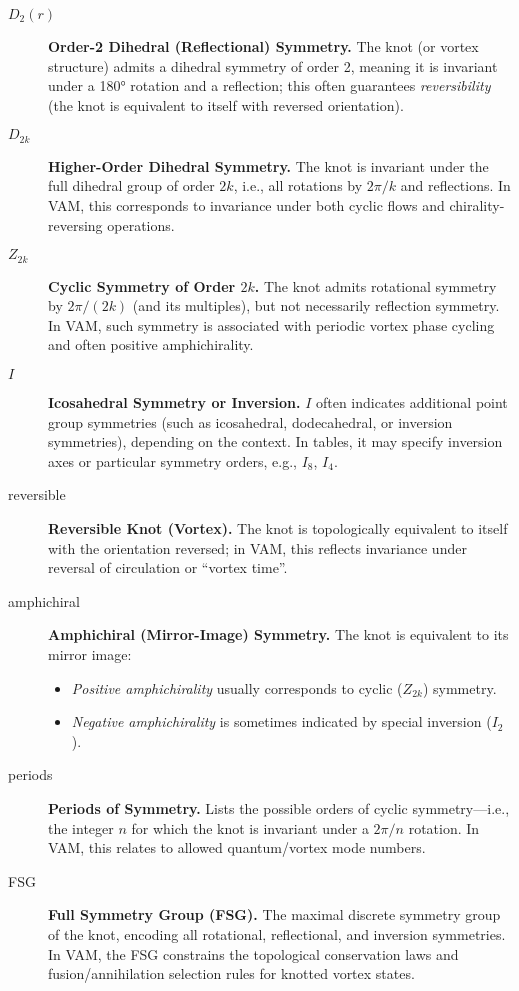 \documentclass{article}
\begin{document}
\begin{description}
    \item[\( D_2(r) \)] \textbf{Order-2 Dihedral (Reflectional) Symmetry.}
    The knot (or vortex structure) admits a dihedral symmetry of order 2, meaning it is invariant under a 180° rotation and a reflection; this often guarantees \emph{reversibility} (the knot is equivalent to itself with reversed orientation).

    \item[\( D_{2k} \)] \textbf{Higher-Order Dihedral Symmetry.}
    The knot is invariant under the full dihedral group of order \( 2k \), i.e., all rotations by \( 2\pi/k \) and reflections. In VAM, this corresponds to invariance under both cyclic flows and chirality-reversing operations.

    \item[\( Z_{2k} \)] \textbf{Cyclic Symmetry of Order \( 2k \).}
    The knot admits rotational symmetry by \( 2\pi/(2k) \) (and its multiples), but not necessarily reflection symmetry. In VAM, such symmetry is associated with periodic vortex phase cycling and often positive amphichirality.

    \item[\( I \)] \textbf{Icosahedral Symmetry or Inversion.}
    \( I \) often indicates additional point group symmetries (such as icosahedral, dodecahedral, or inversion symmetries), depending on the context. In tables, it may specify inversion axes or particular symmetry orders, e.g., \( I_8 \), \( I_4 \).

    \item[reversible] \textbf{Reversible Knot (Vortex).}
    The knot is topologically equivalent to itself with the orientation reversed; in VAM, this reflects invariance under reversal of circulation or “vortex time”.

    \item[amphichiral] \textbf{Amphichiral (Mirror-Image) Symmetry.}
    The knot is equivalent to its mirror image:
    \begin{itemize}\item \emph{Positive amphichirality} usually corresponds to cyclic (\( Z_{2k} \)) symmetry.
    \item \emph{Negative amphichirality} is sometimes indicated by special inversion (\( I_2 \)).
    \end{itemize}
     
     
    \item[periods] \textbf{Periods of Symmetry.}
    Lists the possible orders of cyclic symmetry—i.e., the integer \( n \) for which the knot is invariant under a \( 2\pi/n \) rotation. In VAM, this relates to allowed quantum/vortex mode numbers.

    \item[FSG] \textbf{Full Symmetry Group (FSG).}
    The maximal discrete symmetry group of the knot, encoding all rotational, reflectional, and inversion symmetries. In VAM, the FSG constrains the topological conservation laws and fusion/annihilation selection rules for knotted vortex states.
\end{description}
\end{document}
